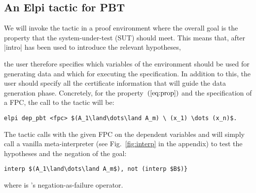 \subsection{An Elpi tactic for PBT}
\label{ssec:dep_pbt}
We will invoke the tactic in a proof environment where the overall
goal is %
the property that the system-under-test (SUT) should meet. This means that,
after \lsti|intro| has been used to introduce the relevant hypotheses,

the user therefore
specifies which variables of the environment should be used for
generating data and which for executing the specification. In addition
to this, the user should specify all the certificate information that
will guide the data generation phase. %
Concretely, for the property~$(\ref{eq:prop})$
and the specification of a FPC, the call to the tactic will be:
\begin{lstlisting}
elpi dep_pbt <fpc> $(A_1\land\dots\land A_m) \ (x_1) \dots (x_n)$.
\end{lstlisting}
The tactic calls  with the given FPC on the dependent
variables and will simply call a vanilla meta-interpreter (see
Fig.~\ref{fig:interp} in the appendix) to test the hypotheses and the negation of the
goal:
\begin{lstlisting}
interp $(A_1\land\dots\land A_m$), not (interp $B$)}
\end{lstlisting}
where  is \lP's negation-as-failure operator.

